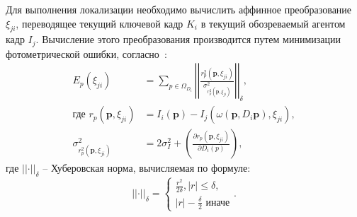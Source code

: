 Для выполнения локализации необходимо вычислить аффинное преобразование $\xi_{ji}$, переводящее текущий ключевой кадр $K_i$ в текущий обозреваемый агентом кадр $I_j$. Вычисление этого преобразования производится путем минимизации фотометрической ошибки, согласно~\cite{tum3DMonoSLAM}:
\begin{equation*}
    \begin{align*}
        E_p(\xi_{ji}) &= \sum \limits_{p \in \Omega_{D_i}} \left|\left| \frac{r^2_p(\mathbf{p}, {\xi_{ji}})}{\sigma^2_{r_p^2(\mathbf{p}, {\xi_{ji}})}} \right|\right|_\delta, \\
        \text{где~} r_p(\mathbf{p}, {\xi_{ji}}) &= I_i(\mathbf{p}) - I_j(\omega(\mathbf{p}, D_i{\mathbf{p}}), {\xi_{ji}}), \\
        \sigma^2_{r_p^2(\mathbf{p}, {\xi_{ji}})} &= 2\sigma^2_I + \left( \frac{\partial r_p(\mathbf{p}, {\xi_{ji}})}{\partial D_i(p)} \right),
    \end{align*}
\end{equation*}
где $\left|\left| \cdot \right|\right|_\delta$ -- Хуберовская норма, вычисляемая по формуле:
\begin{equation*}
    \left|\left| \cdot \right|\right|_\delta = \left\{ \begin{array}{ll}
                                                            \frac{r^2}{2\delta}, |r| \le \delta, \\
                                                            |r| - \frac{\delta}{2} \text{~иначе}
                                                        \end{array}
                                                \right. .
\end{equation*}


